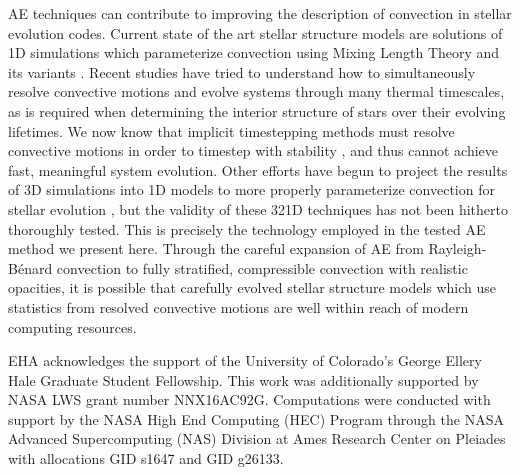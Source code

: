 \documentclass[aps, pre, onecolumn, nofootinbib, notitlepage, groupedaddress, amsfonts, amssymb, amsmath, longbibliography]{revtex4-1}
\newcommand{\RB}{Rayleigh-B\'{e}nard }
\begin{document}
AE techniques can contribute to improving the description of convection
in stellar evolution codes. Current state of the art stellar structure
models are solutions of 1D simulations which parameterize convection 
using Mixing Length Theory and its variants
\cite{paxton&all2011, paxton&all2013, paxton&all2015, paxton&all2018}. 
Recent studies \cite{viallet&all2011, viallet&all2013, viallet&all2016, arnett&all2015, cristini&all2016}
have tried
to understand how to simultaneously resolve convective motions and evolve
systems through many thermal timescales, as is required when determining the
interior structure of stars over their evolving lifetimes.
We now know that implicit timestepping methods
must resolve convective motions in order to timestep with stability
\cite{viallet&all2011, viallet&all2013, viallet&all2016}, and thus
cannot achieve fast, meaningful system evolution.
Other efforts have begun to project the results of 3D simulations into 1D
models to more properly parameterize convection for stellar evolution
\cite{arnett&all2015, cristini&all2016}, but the validity of these 321D techniques
has not been hitherto thoroughly tested. This is precisely the technology
employed in the tested AE method we present here. Through the careful expansion
of AE from \RB convection to fully stratified, compressible convection with realistic
opacities, it is possible that carefully evolved stellar structure models which
use statistics from resolved convective motions are well within reach of modern computing resources.

\begin{acknowledgments}
EHA acknowledges the support of the University of Colorado's George 
Ellery Hale Graduate Student Fellowship.
This work was additionally supported by  NASA LWS grant number NNX16AC92G.  
Computations were conducted 
with support by the NASA High End Computing (HEC) Program through the NASA 
Advanced Supercomputing (NAS) Division at Ames Research Center on Pleiades
with allocations GID s1647 and GID g26133.
\end{acknowledgments}


\appendix
\end{document}
